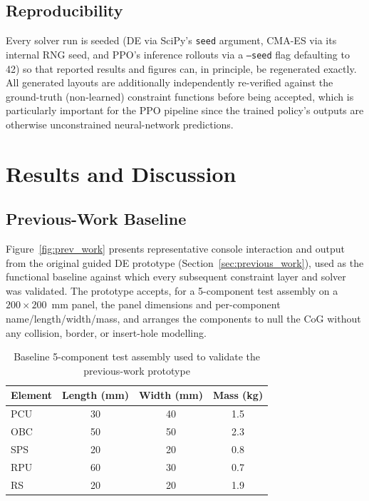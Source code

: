 \documentclass[11pt,a4paper,oneside]{report}
\begin{document}
\section{Reproducibility}
Every solver run is seeded (DE via SciPy's \texttt{seed} argument, CMA-ES via its internal RNG seed, and PPO's inference rollouts via a \texttt{--seed} flag defaulting to 42) so that reported results and figures can, in principle, be regenerated exactly. All generated layouts are additionally independently re-verified against the ground-truth (non-learned) constraint functions before being accepted, which is particularly important for the PPO pipeline since the trained policy's outputs are otherwise unconstrained neural-network predictions.

\chapter{Results and Discussion}
\label{chap:results}

\section{Previous-Work Baseline}
Figure~\ref{fig:prev_work} presents representative console interaction and output from the original guided DE prototype (Section~\ref{sec:previous_work}), used as the functional baseline against which every subsequent constraint layer and solver was validated. The prototype accepts, for a 5-component test assembly on a $200 \times 200$~mm panel, the panel dimensions and per-component name/length/width/mass, and arranges the components to null the CoG without any collision, border, or insert-hole modelling.

\begin{table}[H]
\centering
\caption{Baseline 5-component test assembly used to validate the previous-work prototype}
\label{tab:baseline_components}
\begin{tabular}{|l|c|c|c|}
\hline
\textbf{Element} & \textbf{Length (mm)} & \textbf{Width (mm)} & \textbf{Mass (kg)} \\
\hline
PCU & 30 & 40 & 1.5 \\ \hline
OBC & 50 & 50 & 2.3 \\ \hline
SPS & 20 & 20 & 0.8 \\ \hline
RPU & 60 & 30 & 0.7 \\ \hline
RS  & 20 & 20 & 1.9 \\
\hline
\end{tabular}
\end{table}
\end{document}
